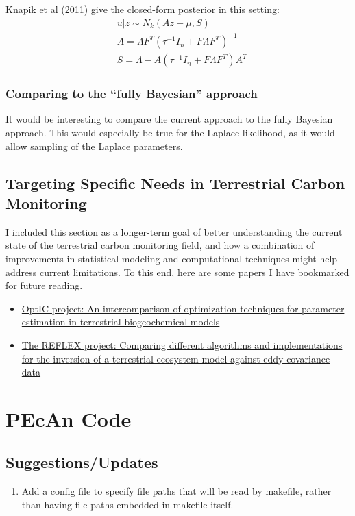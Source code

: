 \documentclass[12pt]{article}
\begin{document}
Knapik et al (2011) give the closed-form posterior in this setting:
\begin{align*}
&u|z \sim N_k(Az + \mu, S) \\
&A = \Lambda F^T(\tau^{-1}I_n + F \Lambda F^T)^{-1} \\
&S = \Lambda - A(\tau^{-1}I_n + F \Lambda F^T)A^T
\end{align*}


\subsubsection{Comparing to the ``fully Bayesian'' approach}
It would be interesting to compare the current approach to the fully Bayesian approach. This would especially be true for the Laplace likelihood, as it would allow sampling of 
the Laplace parameters. 

\subsection{Targeting Specific Needs in Terrestrial Carbon Monitoring}
I included this section as a longer-term goal of better understanding the current state of the terrestrial carbon monitoring field, and how a combination 
of improvements in statistical modeling and computational techniques might help address current limitations. To this end, here are some papers I have bookmarked 
for future reading. 
\begin{itemize}
\item \href{https://www.globalcarbonproject.org/global/pdf/trudinger.07_opti_jgr.pdf}{OptIC project: An intercomparison of optimization techniques for parameter estimation in terrestrial biogeochemical models}
\item \href{https://centaur.reading.ac.uk/28464/1/Fox_etal.REFLEX.AFM.2009.pdf}{The REFLEX project: Comparing different algorithms and implementations for the inversion of a terrestrial ecosystem model against eddy covariance data}
\end{itemize}

\section{PEcAn Code}
\subsection{Suggestions/Updates}
\begin{enumerate}
\item Add a config file to specify file paths that will be read by makefile, rather than having file paths embedded in makefile itself. 
\end{enumerate}
\end{document}
